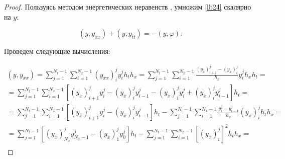 \begin{proof}

Пользуясь методом энергетических неравенств \cite[c.~110]{balk:c21}, умножим \eqref{lb24} скалярно на $y$:

\begin{equation}

\label{lb28}

\left(y,y_{\overline{x}x}\right)+\left(y,y_{\overline{t}t}\right)=-(y,\varphi).

\end{equation}

Проведем следующие вычисления:

\begin{multline}

\left(y,y_{\overline{x}x}\right)=\sum\limits_{j=1}^{N_t-1}\sum\limits_{i=1}^{N_x-1}

\left(y_{\overline{x}x}\right)_{i}^{j} y_{i}^{j} h_t h_x=

\sum\limits_{j=1}^{N_t-1}\sum\limits_{i=1}^{N_x-1} \frac{(y_{\overline{x}})_{i+1}^{j}-(y_{\overline{x}})_{i}^{j}}{h_x} y_{i}^{j} h_x h_t=

\\

=\sum\limits_{j=1}^{N_t-1}\sum\limits_{i=1}^{N_x-1}\left[(y_{\overline{x}})_{i+1}^{j} y_{i}^{j}

-(y_{\overline{x}})_{i}^{j} y_{i-1}^{j}-(y_{\overline{x}})_{i}^{j}  y_{i}^{j}

+(y_{\overline{x}})_{i}^{j}y_{i-1}^{j}\right] h_t=

\\

=\sum\limits_{j=1}^{N_t-1}\sum\limits_{i=1}^{N_x-1}\left[(y_{\overline{x}})_{i+1}^{j} y_{i}^{j}

-(y_{\overline{x}})_{i}^{j} y_{i-1}^{j}\right]h_t-\sum\limits_{j=1}^{N_t-1}\sum\limits_{i=1}^{N_x-1}

\frac{y_{i}^{j}-y_{i-1}^{j}}{h_x}(y_{\overline{x}})_{i}^{j} h_t h_x=

\\

=\sum\limits_{j=1}^{N_t-1}\left[(y_{\overline{x}})_{N_x}^{j} y_{N_x-1}^{j}

-(y_{\overline{x}})_{1}^{j} y_{0}^{j}\right]h_t-\sum\limits_{j=1}^{N_t-1}\sum\limits_{i=1}^{N_x-1}

\left[(y_{\overline{x}})_{i}^{j} \right]^2 h_t h_x=

\\


\end{multline}
\end{proof}
